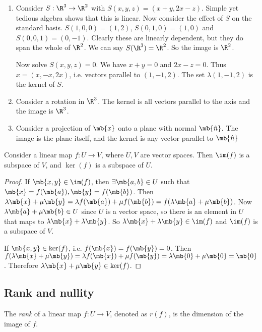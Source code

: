 \documentclass[a4paper]{article}
\begin{document}
\begin{eg}\leavevmode
  \begin{enumerate}
  \item Consider $S: \R^3 \to \R^2$ with $S(x, y, z) = (x + y, 2x - z)$. Simple yet tedious algebra shows that this is linear.
   Now consider the effect of $S$ on the standard basis. $S(1, 0, 0) = (1, 2)$, $S(0, 1, 0) = (1, 0)$ and $S(0, 0, 1) = (0, -1)$. Clearly these are linearly dependent, but they do span the whole of $\R^2$. We can say $S(\R^3) = \R^2$. So the image is $\R^2$.

   Now solve $S(x, y, z) = 0$. We have $x + y = 0$ and $2x - z = 0$. Thus $x = (x, -x, 2x)$, i.e. vectors parallel to $(1, -1, 2)$. The set $\lambda(1, -1, 2)$ is the kernel of $S$.
   \item Consider a rotation in $\R^3$. The kernel is all vectors parallel to the axis and the image is $\R^3$.
   \item Consider a projection of $\mb{x}$ onto a plane with normal $\mb{\hat n}$. The image is the plane itself, and the kernel is any vector parallel to $\mb{\hat n}$
  \end{enumerate}
\end{eg}

\begin{thm}
  Consider a linear map $f: U\to V$, where $U, V$ are vector spaces. Then $\im (f)$ is a subspace of $V$, and $\ker (f)$ is a subspace of $U$.
\end{thm}

\begin{proof}
  If $\mb{x, y}\in \im (f)$, then $\exists \mb{a, b}\in U$ such that $\mb{x} = f(\mb{a}), \mb{y} = f(\mb{b})$.  Then $\lambda \mb{x} + \mu\mb {y} = \lambda f(\mb{a}) + \mu f(\mb{b}) = f(\lambda\mb{a} + \mu\mb{b})$. Now $\lambda\mb{a} + \mu\mb{b}\in U$ since $U$ is a vector space, so there is an element in $U$ that maps to $\lambda\mb{x}+ \lambda\mb{y}$. So $\lambda\mb{x}+ \lambda\mb{y}\in \im (f)$ and $\im (f)$ is a subspace of $V$.

  If $\mb{x, y}\in \ker(f)$, i.e. $f(\mb{x}) = f(\mb {y}) = 0$. Then $f(\lambda\mb{x} + \mu\mb{y}) = \lambda f(\mb{x}) + \mu f(\mb{y}) = \lambda \mb{0} + \mu\mb{0} = \mb{0}$. Therefore $\lambda\mb{x}+ \mu\mb{y} \in \ker (f)$.
\end{proof}

\subsection{Rank and nullity}
\begin{defi}
  The \emph{rank} of a linear map $f: U\to V$, denoted as $r(f)$, is the dimension of the image of $f$.
\end{defi}
\end{document}
